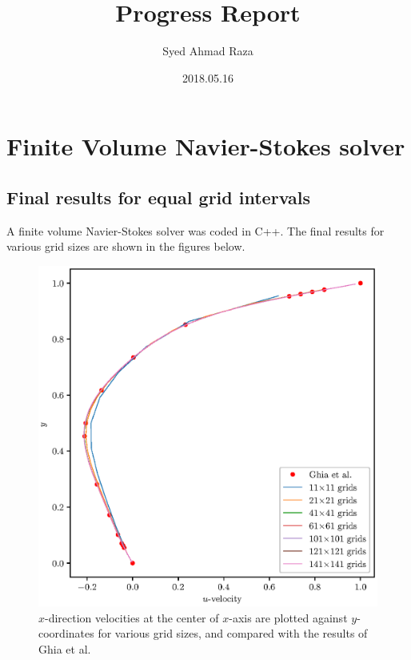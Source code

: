 \documentclass[12pt,a4paper,fleqn]{article}
\title{Progress Report}
\author{Syed Ahmad Raza}
\date{2018.05.16}
\begin{document}
\maketitle

\section{Finite Volume Navier-Stokes solver}

\subsection{Final results for equal grid intervals}
A finite volume Navier-Stokes solver was coded in C++. The final results for various grid sizes are shown in the figures below.

\begin{figure}[H]
    \centering
    \includegraphics[width=\linewidth]{final18051412_cavityFlowU.eps}
    \caption{\(x\)-direction velocities at the center of \(x\)-axis are plotted against \(y\)-coordinates for various grid sizes, and compared with the results of Ghia et al.}
\end{figure}
\end{document}
